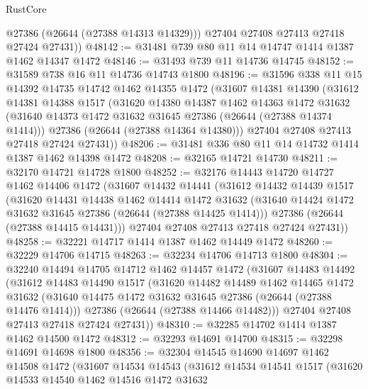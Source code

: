 \begin{lexlean}{RustCore}
\begin{coremodule}
          @27386
          (@26644 (@27388 @14313 @14329)))
        @27404
        @27408
        @27413
        @27418
        @27424
        @27431))
@48142 := @31481 @739 @80 @11 @14 @14747 @1414 @1387 @1462 @14347 @1472
@48146 := @31493 @739 @11 @14736 @14745
@48152 := @31589 @738 @16 @11 @14736 @14743 @1800
@48196 := @31596
    @338
    @11
    @15
    @14392
    @14735
    @14742
    @1462
    @14355
    @1472
    (@31607
      @14381
      @14390
      (@31612
        @14381
        @14388
        @1517
        (@31620
          @14380
          @14387
          @1462
          @14363
          @1472
          @31632
          (@31640 @14373 @1472 @31632 @31645 @27386 (@26644 (@27388 @14374 @1414)))
          @27386
          (@26644 (@27388 @14364 @14380)))
        @27404
        @27408
        @27413
        @27418
        @27424
        @27431))
@48206 := @31481 @336 @80 @11 @14 @14732 @1414 @1387 @1462 @14398 @1472
@48208 := @32165 @14721 @14730
@48211 := @32170 @14721 @14728 @1800
@48252 := @32176
    @14443
    @14720
    @14727
    @1462
    @14406
    @1472
    (@31607
      @14432
      @14441
      (@31612
        @14432
        @14439
        @1517
        (@31620
          @14431
          @14438
          @1462
          @14414
          @1472
          @31632
          (@31640 @14424 @1472 @31632 @31645 @27386 (@26644 (@27388 @14425 @1414)))
          @27386
          (@26644 (@27388 @14415 @14431)))
        @27404
        @27408
        @27413
        @27418
        @27424
        @27431))
@48258 := @32221 @14717 @1414 @1387 @1462 @14449 @1472
@48260 := @32229 @14706 @14715
@48263 := @32234 @14706 @14713 @1800
@48304 := @32240
    @14494
    @14705
    @14712
    @1462
    @14457
    @1472
    (@31607
      @14483
      @14492
      (@31612
        @14483
        @14490
        @1517
        (@31620
          @14482
          @14489
          @1462
          @14465
          @1472
          @31632
          (@31640 @14475 @1472 @31632 @31645 @27386 (@26644 (@27388 @14476 @1414)))
          @27386
          (@26644 (@27388 @14466 @14482)))
        @27404
        @27408
        @27413
        @27418
        @27424
        @27431))
@48310 := @32285 @14702 @1414 @1387 @1462 @14500 @1472
@48312 := @32293 @14691 @14700
@48315 := @32298 @14691 @14698 @1800
@48356 := @32304
    @14545
    @14690
    @14697
    @1462
    @14508
    @1472
    (@31607
      @14534
      @14543
      (@31612
        @14534
        @14541
        @1517
        (@31620
          @14533
          @14540
          @1462
          @14516
          @1472
          @31632

\end{coremodule}
\end{lexlean}
